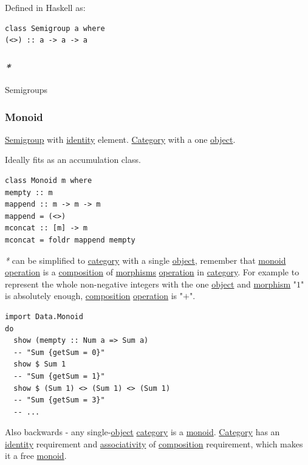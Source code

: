 \documentclass[a4paper,14pt,oneside]{book}
\begin{document}
Defined in Haskell as:
\begin{verbatim}
class Semigroup a where
(<>) :: a -> a -> a
\end{verbatim}

\subsubsection{\emph{*}}
\label{sec:org6406afe}

\label{org61f0872}Semigroups

\subsubsection{\label{org2ed215c}Monoid}
\label{sec:orgdac2d8b}
\hyperref[org7616739]{Semigroup} with \hyperref[org743971b]{identity} element. \hyperref[org62e5296]{Category} with a one \hyperref[org32ba1f2]{object}.

Ideally fits as an accumulation class.

\begin{verbatim}
class Monoid m where
mempty :: m
mappend :: m -> m -> m
mappend = (<>)
mconcat :: [m] -> m
mconcat = foldr mappend mempty
\end{verbatim}

\emph{*} can be simplified to \hyperref[org62e5296]{category} with a single \hyperref[org32ba1f2]{object}, remember that \hyperref[org2ed215c]{monoid} \hyperref[org7e4bb21]{operation} is a \hyperref[orgf6aadf6]{composition} of \hyperref[orgceca30d]{morphisms} \hyperref[org7e4bb21]{operation} in \hyperref[org62e5296]{category}.
For example to represent the whole non-negative integers with the one \hyperref[org32ba1f2]{object} and \hyperref[org125a306]{morphism} "\(1\)" is absolutely enough, \hyperref[orgf6aadf6]{composition} \hyperref[org7e4bb21]{operation} is "\(+\)".

\begin{verbatim}
import Data.Monoid
do
  show (mempty :: Num a => Sum a)
  -- "Sum {getSum = 0}"
  show $ Sum 1
  -- "Sum {getSum = 1}"
  show $ (Sum 1) <> (Sum 1) <> (Sum 1)
  -- "Sum {getSum = 3}"
  -- ...
\end{verbatim}

Also backwards - any single-\hyperref[org32ba1f2]{object} \hyperref[org62e5296]{category} is a \hyperref[org2ed215c]{monoid}. \hyperref[org62e5296]{Category} has an \hyperref[org743971b]{identity} requirement and \hyperref[org262190c]{associativity} of \hyperref[orgf6aadf6]{composition} requirement, which makes it a free \hyperref[org2ed215c]{monoid}. 
\end{document}
